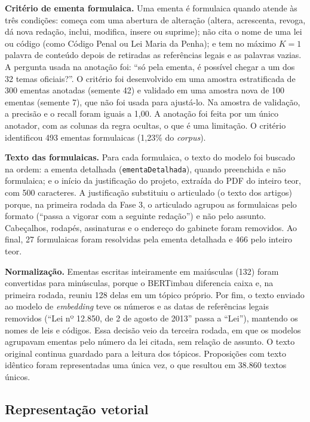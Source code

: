 \textbf{Critério de ementa formulaica.} Uma ementa é formulaica quando atende às três condições: começa com uma abertura de alteração (altera, acrescenta, revoga, dá nova redação, inclui, modifica, insere ou suprime); não cita o nome de uma lei ou código (como Código Penal ou Lei Maria da Penha); e tem no máximo $K = 1$ palavra de conteúdo depois de retiradas as referências legais e as palavras vazias. A pergunta usada na anotação foi: ``só pela ementa, é possível chegar a um dos 32 temas oficiais?''. O critério foi desenvolvido em uma amostra estratificada de 300 ementas anotadas (semente 42) e validado em uma amostra nova de 100 ementas (semente 7), que não foi usada para ajustá-lo. Na amostra de validação, a precisão e o recall foram iguais a 1,00. A anotação foi feita por um único anotador, com as colunas da regra ocultas, o que é uma limitação. O critério identificou 493 ementas formulaicas (1,23\% do \textit{corpus}).

\textbf{Texto das formulaicas.} Para cada formulaica, o texto do modelo foi buscado na ordem: a ementa detalhada (\texttt{ementaDetalhada}), quando preenchida e não formulaica; e o início da justificação do projeto, extraída do PDF do inteiro teor, com 500 caracteres. A justificação substituiu o articulado (o texto dos artigos) porque, na primeira rodada da Fase 3, o articulado agrupou as formulaicas pelo formato (``passa a vigorar com a seguinte redação'') e não pelo assunto. Cabeçalhos, rodapés, assinaturas e o endereço do gabinete foram removidos. Ao final, 27 formulaicas foram resolvidas pela ementa detalhada e 466 pelo inteiro teor.

\textbf{Normalização.} Ementas escritas inteiramente em maiúsculas (132) foram convertidas para minúsculas, porque o BERTimbau diferencia caixa e, na primeira rodada, reuniu 128 delas em um tópico próprio. Por fim, o texto enviado ao modelo de \textit{embedding} teve os números e as datas de referências legais removidos (``Lei nº 12.850, de 2 de agosto de 2013'' passa a ``Lei''), mantendo os nomes de leis e códigos. Essa decisão veio da terceira rodada, em que os modelos agrupavam ementas pelo número da lei citada, sem relação de assunto. O texto original continua guardado para a leitura dos tópicos. Proposições com texto idêntico foram representadas uma única vez, o que resultou em 38.860 textos únicos.

\subsection{Representação vetorial}
\label{subsec:embeddings}

